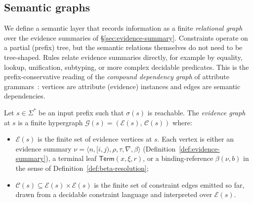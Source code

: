 \subsection{Semantic graphs}
\label{sec:semantic-domains}

We define a semantic layer that records information as a finite \emph{relational graph} over the evidence summaries of \S\ref{sec:evidence-summary}. Constraints operate on a partial (prefix) tree, but the semantic relations themselves do not need to be tree-shaped. Rules relate evidence summaries directly, for example by equality, lookup, unification, subtyping, or more complex decidable predicates. This is the prefix-conservative reading of the \emph{compound dependency graph} of attribute grammars~\cite{knuth1968semantics,demers1981incremental}: vertices are attribute (evidence) instances and edges are semantic dependencies.

\begin{definition}
\label{def:evidence-graph}
Let $s \in \Sigma^\ast$ be an input prefix such that $\sigma(s)$ is reachable. The \emph{evidence graph} at $s$ is a finite hypergraph $\mathcal G(s) = (\mathcal E(s),\, \mathcal C(s))$ where:
\begin{itemize}
  \item $\mathcal E(s)$ is the finite set of evidence vertices at $s$. Each vertex is either an evidence summary $\nu = \langle n,[i,j),\rho,\tau,\nabla,\beta\rangle$ (Definition~\ref{def:evidence-summary}), a terminal leaf $\mathsf{Term}(x,\xi,r)$, or a binding-reference $\beta(\nu,b)$ in the sense of Definition~\ref{def:beta-resolution};
  \item $\mathcal C(s) \subseteq \mathcal E(s) \times \mathcal E(s)$ is the finite set of constraint edges emitted so far, drawn from a decidable constraint language and interpreted over $\mathcal E(s)$.
\end{itemize}
\end{definition}

